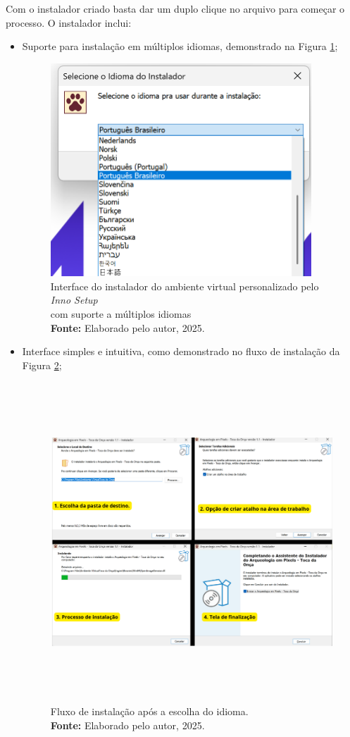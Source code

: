 Com o instalador criado basta dar um duplo clique no arquivo para começar o processo. O instalador inclui:
\begin{itemize}
    \item Suporte para instalação em múltiplos idiomas, demonstrado na Figura \ref{fig:idiomas};
    \begin{figure}[H]
        \centering
        \includegraphics[height=8cm, keepaspectratio]{img/Inno setup/multiidiomas.png}
        \caption{Interface do instalador do ambiente virtual personalizado pelo \textit{Inno Setup }\\ com suporte a múltiplos idiomas \\
            \textbf{Fonte:} Elaborado pelo autor, 2025.}
        \label{fig:idiomas}
\end{figure}

    \item Interface simples e intuitiva, como demonstrado no fluxo de instalação da Figura \ref{fig:fluxo};
    \begin{figure}[H]
        \centering
        \includegraphics[height=12cm, keepaspectratio]{img/Inno setup/fluxo de instalação.png}
        \caption{Fluxo de instalação após a escolha do idioma. \\
            \textbf{Fonte:} Elaborado pelo autor, 2025.}
        \label{fig:fluxo}
\end{figure}


\end{itemize}
